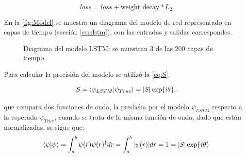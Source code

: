 \[ loss = loss + \text{weight decay}*L_2\]

En la \autoref{fig:Model} se muestra un diagrama del modelo de red representado en capas de tiempo (sección \autoref{sec:lstm}), con las entradas y salidas correspondes.

\begin{figure}[!htbp]
  \centering
  \caption{Diagrama del modelo \acs{LSTM}: se muestran 3 de las 200 capas de tiempo.}
  \label{fig:Model}
\end{figure}

Para calcular la precisión del modelo se utilizó la \autoref{eq:S}:

\begin{equation}
  \label{eq:S}
  S = \bra{\psi_{LSTM}}\ket{\psi_{True}} = |S|\exp{i\theta},
\end{equation}

\noindent que compara dos funciones de onda, la predicha por el modelo $\psi_{LSTM}$ respecto a la esperada $\psi_{True}$, cuando se trata de la misma función de onda, dado que están normalizadas, se sigue que:
\begin{equation*}
  \bra{\psi}\ket{\psi} = \int_{a}^{b}\psi(r) \psi(r)^\dag dr = \int_{a}^{b}|\psi(r)| dr = 1 = |S|\exp{i\theta}
\end{equation*}

